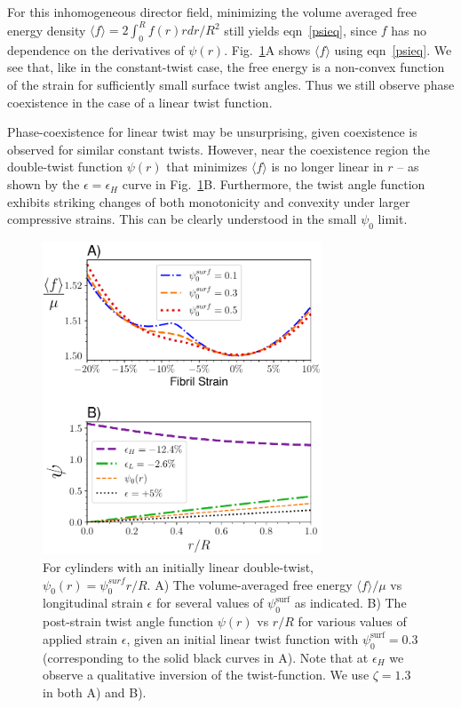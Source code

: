 \documentclass[twoside,twocolumn,9pt]{article}
\begin{document}
For this inhomogeneous director field, minimizing the volume averaged free energy density $\langle f \rangle= 2 \int_0^R f(r) rdr /R^2$ still yields eqn~\eqref{psieq}, since $f$ has no dependence on the derivatives of $\psi(r)$.  Fig.~\ref{fig:lineartwist}A shows $\langle f\rangle$ using eqn~\eqref{psieq}. We see that, like in the constant-twist case, the free energy is a non-convex function of the strain for sufficiently small surface twist angles. Thus we still observe phase coexistence in the case of a linear twist function.

Phase-coexistence for linear twist may be unsurprising, given coexistence is observed for similar constant twists. However, near the coexistence region the double-twist function $\psi(r)$ that minimizes $\langle f \rangle$ is no longer linear in $r$ -- as shown by the $\epsilon=\epsilon_H$ curve in Fig.~\ref{fig:lineartwist}B. Furthermore, the twist angle function exhibits striking changes of both monotonicity and convexity under larger compressive strains. This can be clearly understood in the small $\psi_0$ limit.

\begin{figure}[t!] %
\centering
  \includegraphics[width=8.3cm]{Figure_4.pdf} 
  \caption{For cylinders with an initially linear double-twist, $\psi_0(r) = \psi_0^{surf} r/R$. A) The volume-averaged free energy $\langle f \rangle/\mu$ vs longitudinal strain $\epsilon$ for several values of $\psi_0^\text{surf}$ as indicated.   B) The post-strain twist angle function $\psi(r)$  vs $r/R$ for various values of applied strain $\epsilon$, given an initial linear twist function with $\psi_0^\text{surf}=0.3$ (corresponding to the solid black curves in A). Note that at $\epsilon_H$ we observe a qualitative inversion of the twist-function. We use $\zeta=1.3$ in both A) and B).}
  \label{fig:lineartwist}
\end{figure}
\end{document}
